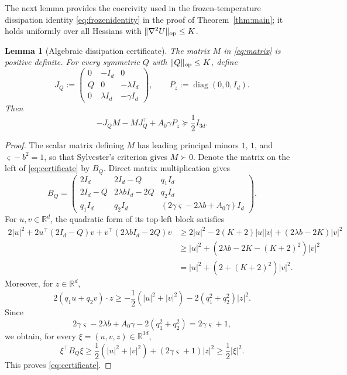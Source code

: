 \documentclass[11pt]{article}
\newtheorem{lemma}[theorem]{Lemma}
\theoremstyle{definition}
\newcommand{\R}{\mathbb R}
\newcommand{\Id}{I}
\begin{document}
The next lemma provides the coercivity used in the frozen-temperature
dissipation identity \eqref{eq:frozenidentity} in the proof of
Theorem~\ref{thm:main}; it holds uniformly over all Hessians with
$\|\nabla^2U\|_{\rm op}\leq K$.

\begin{lemma}[Algebraic dissipation certificate]\label{lem:matrix}
The matrix $M$ in \eqref{eq:matrix} is positive definite. For every symmetric $Q$ with
$\|Q\|_{\rm op}\leq K$, define
\[
 J_Q:=\begin{pmatrix}0&-\Id_{d}&0\\Q&0&-\lambda\Id_{d}\\0&\lambda\Id_{d}&-\gamma\Id_{d}\end{pmatrix},
 \qquad P_z:=\operatorname{diag}(0,0,\Id_d).
\]
Then
\begin{equation}\label{eq:certificate}
 -J_QM-MJ_Q^\top+A_0\gamma P_z\succeq\frac12\Id_{3d}.
\end{equation}
\end{lemma}
\begin{proof}
The scalar matrix defining $M$ has leading principal minors
$1$, $1$, and $\varsigma-b^2=1$, so that Sylvester's criterion gives $M\succ0$.
Denote the matrix on the left of \eqref{eq:certificate} by $B_Q$. Direct
matrix multiplication gives
\[
 B_Q=\begin{pmatrix}
 2\Id_{d}&2\Id_{d}-Q&q_1\Id_{d}\\
 2\Id_{d}-Q&2\lambda b\Id_{d}-2Q&q_2\Id_{d}\\
 q_1\Id_{d}&q_2\Id_d&(2\gamma\varsigma-2\lambda b+A_0\gamma)\Id_{d}
 \end{pmatrix}.
\]
For $u,v\in\R^d$, the quadratic form of its top-left block satisfies
\begin{align*}
 2|u|^2+2u^\top(2\Id_{d}-Q)v+v^\top(2\lambda b\Id_d-2Q)v
 &\geq 2|u|^2-2(K+2)|u||v|+(2\lambda b-2K)|v|^2\\
 &\geq |u|^2+\left(2\lambda b-2K-(K+2)^2\right)|v|^2\\
 &=|u|^2+\left(2+(K+2)^2\right)|v|^2.
\end{align*}
Moreover, for $z\in\R^d$,
\[
 2(q_1u+q_2v)\cdot z
 \geq-\frac12\left(|u|^2+|v|^2\right)
      -2\left(q_1^2+q_2^2\right)|z|^2.
\]
Since
\[
 2\gamma\varsigma-2\lambda b+A_0\gamma-2\left(q_1^2+q_2^2\right)=2\gamma\varsigma+1,
\]
we obtain, for every $\xi=(u,v,z)\in\R^{3d}$,
\[
 \xi^\top B_Q\xi
 \geq\frac12\left(|u|^2+|v|^2\right)+(2\gamma\varsigma+1)|z|^2
 \geq\frac12|\xi|^2.
\]
This proves \eqref{eq:certificate}.
\end{proof}
\end{document}
